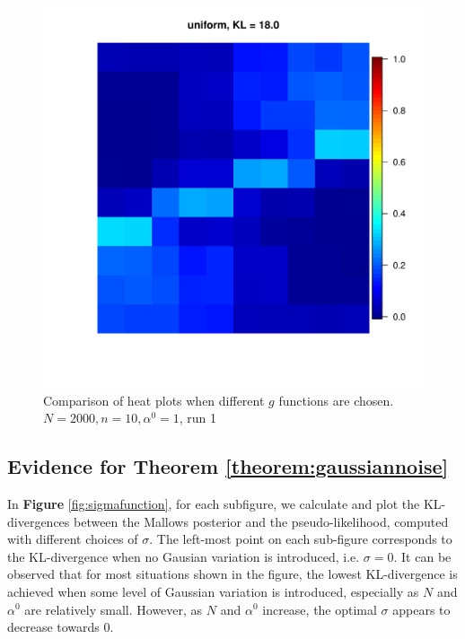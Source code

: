 \documentclass[11pt, oneside]{article}   	%
\begin{document}
\begin{figure}[h!]
\begin{minipage}[t]{.45\textwidth}
		\end{minipage} 
		\hfill
		\begin{minipage}[t]{.45\textwidth}
			\centering
			\includegraphics[width=\textwidth]{figures/theorem2_2/heat_uniform_N2000n10alpha1run1.pdf}
			
		\end{minipage} 

	\caption{Comparison of heat plots when different $g$ functions are chosen. $N = 2000, n = 10, \alpha^0 = 1$, run 1}
	\label{fig:heatPlot_comparison_g}
\end{figure}


\subsection{Evidence for Theorem \ref{theorem:gaussiannoise}}
In \textbf{Figure} \ref{fig:sigmafunction}, for each subfigure, we calculate and plot the KL-divergences between the Mallows posterior and the pseudo-likelihood, computed with different choices of $\sigma$. The left-most point on each sub-figure corresponds to the KL-divergence when no Gausian variation is introduced, i.e. $\sigma = 0$. It can be observed that for most situations shown in the figure, the lowest KL-divergence is achieved when some level of Gaussian variation is introduced, especially as $N$ and $\alpha^0$ are relatively small. However, as $N$ and $\alpha^0$ increase, the optimal $\sigma$ appears to decrease towards 0. 
\end{document}
